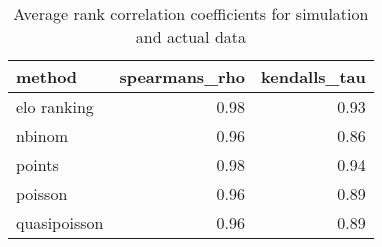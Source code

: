 \begin{table}[ht]
\centering
\begin{tabular}{lrr}
  \hline
method & spearmans\_rho & kendalls\_tau \\ 
  \hline
elo ranking & 0.98 & 0.93 \\ 
  nbinom & 0.96 & 0.86 \\ 
  points & 0.98 & 0.94 \\ 
  poisson & 0.96 & 0.89 \\ 
  quasipoisson & 0.96 & 0.89 \\ 
   \hline
\end{tabular}
\caption{Average rank correlation coefficients for simulation and actual data} 
\end{table} 
